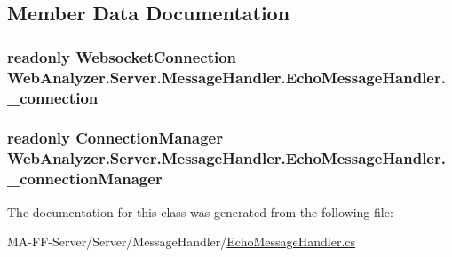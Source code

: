 \subsection{Member Data Documentation}
\hypertarget{class_web_analyzer_1_1_server_1_1_message_handler_1_1_echo_message_handler_a2a7b752d022345cb8b575f4a84435e1e}{}
\subsubsection[{\+\_\+connection}]{\setlength{\rightskip}{0pt plus 5cm}readonly {\bf Websocket\+Connection} Web\+Analyzer.\+Server.\+Message\+Handler.\+Echo\+Message\+Handler.\+\_\+connection\hspace{0.3cm}{\ttfamily [private]}}\label{class_web_analyzer_1_1_server_1_1_message_handler_1_1_echo_message_handler_a2a7b752d022345cb8b575f4a84435e1e}
\hypertarget{class_web_analyzer_1_1_server_1_1_message_handler_1_1_echo_message_handler_a936f408ce4e67d13029830db8a3cd398}{}
\subsubsection[{\+\_\+connection\+Manager}]{\setlength{\rightskip}{0pt plus 5cm}readonly {\bf Connection\+Manager} Web\+Analyzer.\+Server.\+Message\+Handler.\+Echo\+Message\+Handler.\+\_\+connection\+Manager\hspace{0.3cm}{\ttfamily [private]}}\label{class_web_analyzer_1_1_server_1_1_message_handler_1_1_echo_message_handler_a936f408ce4e67d13029830db8a3cd398}


The documentation for this class was generated from the following file\+:\begin{DoxyCompactItemize}
\item 
M\+A-\/\+F\+F-\/\+Server/\+Server/\+Message\+Handler/\hyperlink{_echo_message_handler_8cs}{Echo\+Message\+Handler.\+cs}\end{DoxyCompactItemize}
